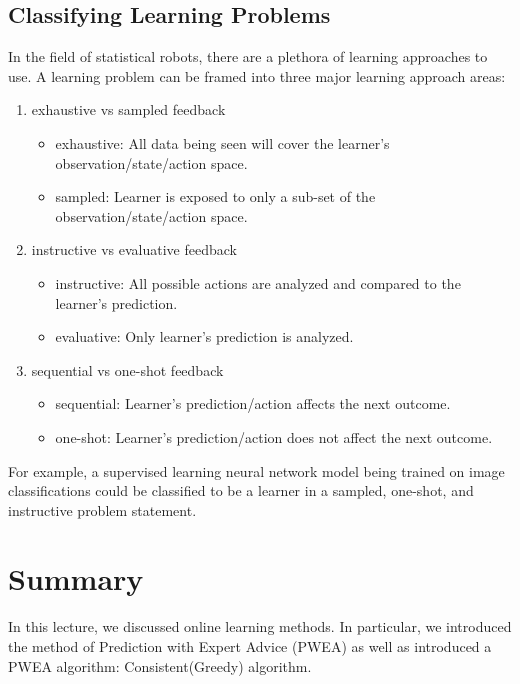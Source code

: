 \documentclass[11pt]{article}
\begin{document}
        
\subsection{Classifying Learning Problems}
In the field of statistical robots, there are a plethora of learning approaches to use. A learning problem can be framed into three major learning approach areas\cite{littman2015reinforcement}:

\begin{enumerate}
    \item exhaustive vs sampled feedback
    \begin{itemize}
        \item exhaustive: All data being seen will cover the learner's observation/state/action space.
        \item sampled: Learner is exposed to only a sub-set of the observation/state/action space.
    \end{itemize}
    \item instructive vs evaluative feedback
    \begin{itemize}
        \item instructive: All possible actions are analyzed and compared to the learner's prediction.
        \item evaluative: Only learner's prediction is analyzed.
    \end{itemize}
    \item sequential vs one-shot feedback
    \begin{itemize}
        \item sequential: Learner's prediction/action affects the next outcome.
        \item one-shot: Learner's prediction/action does not affect the next outcome.
    \end{itemize}
    
\end{enumerate} 

For example, a supervised learning neural network model being trained on image classifications could be classified to be a learner in a sampled, one-shot, and instructive problem statement.

\section{Summary}

In this lecture, we discussed online learning methods. In particular, 
we introduced the method of Prediction with Expert Advice (PWEA) as well as introduced a PWEA algorithm: Consistent(Greedy) algorithm.
\end{document}
